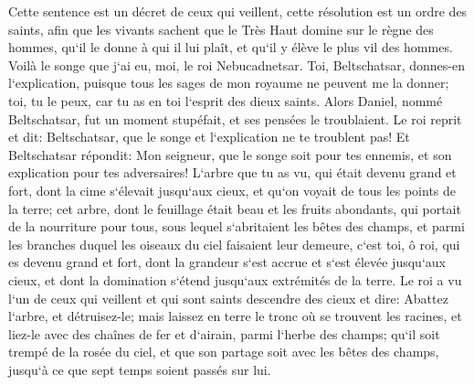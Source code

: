 \verse Cette sentence est un décret de ceux qui veillent, cette résolution est un ordre des saints, afin que les vivants sachent que le Très Haut domine sur le règne des hommes, qu`il le donne à qui il lui plaît, et qu`il y élève le plus vil des hommes. 
\verse Voilà le songe que j`ai eu, moi, le roi Nebucadnetsar. Toi, Beltschatsar, donnes-en l`explication, puisque tous les sages de mon royaume ne peuvent me la donner; toi, tu le peux, car tu as en toi l`esprit des dieux saints. 
\verse Alors Daniel, nommé Beltschatsar, fut un moment stupéfait, et ses pensées le troublaient. Le roi reprit et dit: Beltschatsar, que le songe et l`explication ne te troublent pas! Et Beltschatsar répondit: Mon seigneur, que le songe soit pour tes ennemis, et son explication pour tes adversaires! 
\verse L`arbre que tu as vu, qui était devenu grand et fort, dont la cime s`élevait jusqu`aux cieux, et qu`on voyait de tous les points de la terre; 
\verse cet arbre, dont le feuillage était beau et les fruits abondants, qui portait de la nourriture pour tous, sous lequel s`abritaient les bêtes des champs, et parmi les branches duquel les oiseaux du ciel faisaient leur demeure, 
\verse c`est toi, ô roi, qui es devenu grand et fort, dont la grandeur s`est accrue et s`est élevée jusqu`aux cieux, et dont la domination s`étend jusqu`aux extrémités de la terre. 
\verse Le roi a vu l`un de ceux qui veillent et qui sont saints descendre des cieux et dire: Abattez l`arbre, et détruisez-le; mais laissez en terre le tronc où se trouvent les racines, et liez-le avec des chaînes de fer et d`airain, parmi l`herbe des champs; qu`il soit trempé de la rosée du ciel, et que son partage soit avec les bêtes des champs, jusqu`à ce que sept temps soient passés sur lui. 
